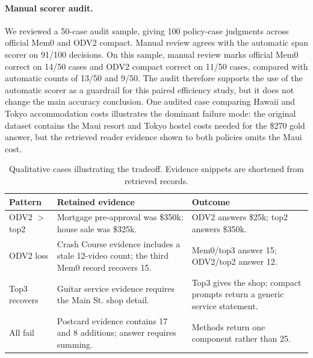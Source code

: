 \documentclass{article}
\begin{document}
\paragraph{Manual scorer audit.}
We reviewed a 50-case audit sample, giving 100 policy-case judgments across official Mem0 and ODV2 compact. Manual review agrees with the automatic span scorer on 91/100 decisions. On this sample, manual review marks official Mem0 correct on 14/50 cases and ODV2 compact correct on 11/50 cases, compared with automatic counts of 13/50 and 9/50. The audit therefore supports the use of the automatic scorer as a guardrail for this paired efficiency study, but it does not change the main accuracy conclusion. One audited case comparing Hawaii and Tokyo accommodation costs illustrates the dominant failure mode: the original dataset contains the Maui resort and Tokyo hostel costs needed for the \$270 gold answer, but the retrieved reader evidence shown to both policies omits the Maui cost.

\begin{table}[t]
\caption{Qualitative cases illustrating the tradeoff. Evidence snippets are shortened from retrieved records.}
\label{tab:qualitative}
\vskip 0.1in
\begin{center}
\begin{scriptsize}
\begin{tabular}{@{}p{}p{}p{}@{}}
\toprule
Pattern & Retained evidence & Outcome \\
\midrule
ODV2 $>$ top2 & Mortgage pre-approval was \$350k; house sale was \$325k. & ODV2 answers \$25k; top2 answers \$350k. \\
\midrule
ODV2 loss & Crash Course evidence includes a stale 12-video count; the third Mem0 record recovers 15. & Mem0/top3 answer 15; ODV2/top2 answer 12. \\
\midrule
Top3 recovers & Guitar service evidence requires the Main St. shop detail. & Top3 gives the shop; compact prompts return a generic service statement. \\
\midrule
All fail & Postcard evidence contains 17 and 8 additions; answer requires summing. & Methods return one component rather than 25. \\
\bottomrule
\end{tabular}
\end{scriptsize}
\end{center}
\vskip -0.1in
\end{table}
\end{document}
